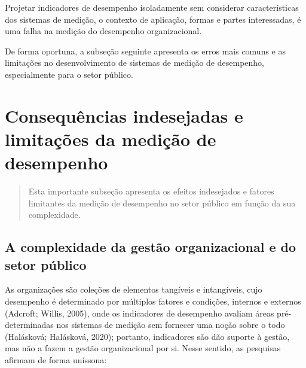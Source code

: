 \documentclass[
  letterpaper,
  DIV=11,
  numbers=noendperiod]{scrreprt}
\begin{document}
\begin{tcolorbox}[enhanced jigsaw, colframe=quarto-callout-warning-color-frame, opacityback=0, toprule=.15mm, breakable, leftrule=.75mm, title=\textcolor{quarto-callout-warning-color}{\faExclamationTriangle}\hspace{0.5em}{Alerta!}, rightrule=.15mm, colbacktitle=quarto-callout-warning-color!10!white, colback=white, arc=.35mm, bottomtitle=1mm, toptitle=1mm, bottomrule=.15mm, titlerule=0mm, opacitybacktitle=0.6, coltitle=black, left=2mm]

Projetar indicadores de desempenho isoladamente sem considerar
características dos sistemas de medição, o contexto de aplicação, formas
e partes interessadas, é uma falha na medição do desempenho
organizacional.

\end{tcolorbox}

De forma oportuna, a subseção seguinte apresenta os erros mais comuns e
as limitações no desenvolvimento de sistemas de medição de desempenho,
especialmente para o setor público.

\hypertarget{consequuxeancias-indesejadas-e-limitauxe7uxf5es-da-mediuxe7uxe3o-de-desempenho}{%
\chapter{Consequências indesejadas e limitações da medição de
desempenho}\label{consequuxeancias-indesejadas-e-limitauxe7uxf5es-da-mediuxe7uxe3o-de-desempenho}}

\begin{quote}
Esta importante subseção apresenta os efeitos indesejados e fatores
limitantes da medição de desempenho no setor público em função da sua
complexidade.
\end{quote}

\hypertarget{a-complexidade-da-gestuxe3o-organizacional-e-do-setor-puxfablico}{%
\section{A complexidade da gestão organizacional e do setor
público}\label{a-complexidade-da-gestuxe3o-organizacional-e-do-setor-puxfablico}}

As organizações são coleções de elementos tangíveis e intangíveis, cujo
desempenho é determinado por múltiplos fatores e condições, internos e
externos (Adcroft; Willis, 2005), onde os indicadores de desempenho
avaliam áreas pré-determinadas nos sistemas de medição sem fornecer uma
noção sobre o todo (Halásková; Halásková, 2020); portanto, indicadores
são dão suporte à gestão, mas não a fazem a gestão organizacional por
si. Nesse sentido, as pesquisas afirmam de forma uníssona:
\end{document}
